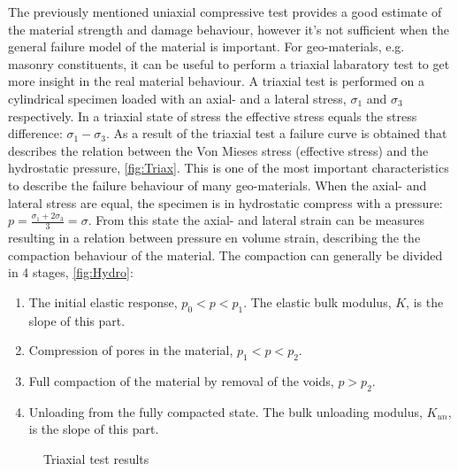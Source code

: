 The previously mentioned uniaxial compressive test provides a good estimate of the material strength and damage behaviour, however it's not sufficient when the general failure model of the material is important. For geo-materials, e.g. masonry constituents, it can be useful to perform a triaxial labaratory test to get more insight in the real material behaviour. A triaxial test is performed on a cylindrical specimen loaded with an axial- and a lateral stress, $\sigma_{1}$ and $\sigma_{3}$ respectively. In a triaxial state of stress the effective stress equals the stress difference: $\sigma_{1}-\sigma_{3}$. As a result of the triaxial test a failure curve is obtained that describes the relation between the Von Mieses stress (effective stress) and the hydrostatic pressure, \autoref{fig:Triax}. This is one of the most important characteristics to describe the failure behaviour of many geo-materials. When the axial- and lateral stress are equal, the specimen is in hydrostatic compress with a pressure: $p = \frac{\sigma_{1} + 2\sigma_{3}}{3} = \sigma$. From this state the axial- and lateral strain can be measures resulting in a relation between pressure en volume strain, describing the the compaction behaviour of the material. The compaction can generally be divided in 4 stages, \autoref{fig:Hydro}:

\begin{enumerate}
    \item The initial elastic response, $p_{0}<p<p_{1}$. The elastic bulk modulus, $K$, is the slope of this part.
    \item Compression of pores in the material, $p_{1}<p<p_{2}$.
    \item Full compaction of the material by removal of the voids, $p>p_{2}$.
    \item Unloading from the fully compacted state. The bulk unloading modulus, $K_{un}$, is the slope of this part.
\end{enumerate}

\begin{figure}[!htb]
    \centering
    \caption{Triaxial test results \cite{bakeer2009collapse,schwer2001laboratory}}
    \label{fig:Triax-res}
\end{figure}


